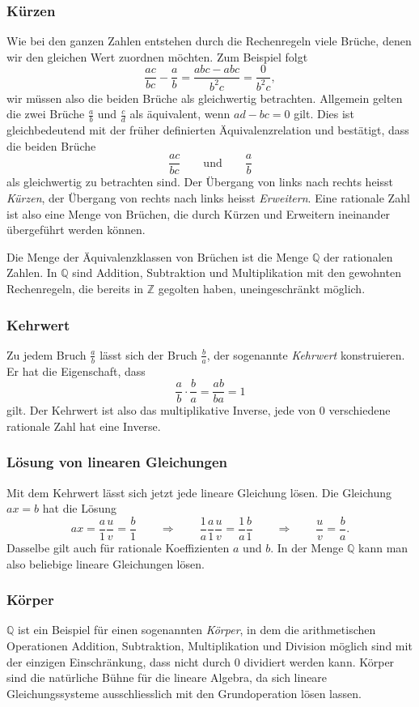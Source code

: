 \subsubsection{Kürzen}
Wie bei den ganzen Zahlen entstehen durch die Rechenregeln viele Brüche,
denen wir den gleichen Wert zuordnen möchten.
Zum Beispiel folgt
\[
\frac{ac}{bc} - \frac{a}{b} 
=
\frac{abc-abc}{b^2c}
=
\frac{0}{b^2c},
\]
wir müssen also die beiden Brüche als gleichwertig betrachten.
Allgemein gelten die zwei Brüche $\frac{a}{b}$ und $\frac{c}{d}$
als äquivalent, wenn $ad-bc= 0$ gilt.
Dies ist gleichbedeutend mit der früher definierten Äquivalenzrelation
und bestätigt, dass die beiden Brüche
\[
\frac{ac}{bc} 
\qquad\text{und}\qquad
\frac{a}{b}
\]
als gleichwertig zu betrachten sind.
Der Übergang von links nach rechts heisst {\em Kürzen},
%
der Übergang von rechts nach links heisst {\em Erweitern}.
%
Eine rationale Zahl ist also eine Menge von Brüchen, die durch
Kürzen und Erweitern ineinander übergeführt werden können.

Die Menge der Äquivalenzklassen von Brüchen ist die Menge $\mathbb{Q}$
der rationalen Zahlen.
In $\mathbb{Q}$ sind Addition, Subtraktion und Multiplikation mit den
gewohnten Rechenregeln, die bereits in $\mathbb{Z}$ gegolten haben,
uneingeschränkt möglich.

\subsubsection{Kehrwert}
Zu jedem Bruch $\frac{a}{b}$ lässt sich der Bruch $\frac{b}{a}$,
der sogenannte {\em Kehrwert}
konstruieren.
Er hat die Eigenschaft, dass
\[
\frac{a}{b}\cdot\frac{b}{a}
=
\frac{ab}{ba}
=
1
\]
gilt.
Der Kehrwert ist also das multiplikative Inverse, jede von $0$ verschiedene
rationale Zahl hat eine Inverse.

\subsubsection{Lösung von linearen Gleichungen}
Mit dem Kehrwert lässt sich jetzt jede lineare Gleichung lösen.
Die Gleichung $ax=b$ hat die Lösung
\[
ax = \frac{a}{1} \frac{u}{v} = \frac{b}{1}
\qquad\Rightarrow\qquad
\frac{1}{a}
 \frac{a}{1} \frac{u}{v} = \frac{1}{a}\frac{b}{1} 
\qquad\Rightarrow\qquad
\frac{u}{v} = \frac{b}{a}.
\]
Dasselbe gilt auch für rationale Koeffizienten $a$ und $b$.
In der Menge $\mathbb{Q}$ kann man also beliebige lineare Gleichungen
lösen.

\subsubsection{Körper}
$\mathbb{Q}$ ist ein Beispiel für einen sogenannten {\em Körper}, 
in dem die arithmetischen Operationen Addition, Subtraktion, Multiplikation
und Division möglich sind mit der einzigen Einschränkung, dass nicht durch
$0$ dividiert werden kann.
Körper sind die natürliche Bühne für die lineare Algebra, da sich lineare
Gleichungssysteme ausschliesslich mit den Grundoperation lösen lassen.

